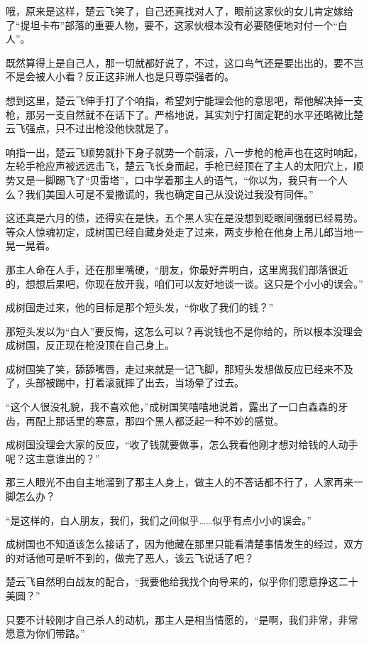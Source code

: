 哦，原来是这样，楚云飞笑了，自己还真找对人了，眼前这家伙的女儿肯定嫁给了“提坦卡布”部落的重要人物，要不，这家伙根本没有必要随便地对付一个“白人”。

既然算得上是自己人，那一切就都好说了，不过，这口鸟气还是要出出的，要不岂不是会被人小看？反正这非洲人也是只尊崇强者的。

想到这里，楚云飞伸手打了个响指，希望刘宁能理会他的意思吧，帮他解决掉一支枪，那另一支自然就不在话下了。严格地说，其实刘宁打固定靶的水平还略微比楚云飞强点，只不过出枪没他快就是了。

响指一出，楚云飞顺势就扑下身子就势一个前滚，八一步枪的枪声也在这时响起，左轮手枪应声被远远击飞，楚云飞长身而起，手枪已经顶在了主人的太阳穴上，顺势又是一脚踢飞了“贝雷塔”，口中学着那主人的语气，“你以为，我只有一个人么？我们美国人可是不爱撒谎的，我也确定自己从没说过我没有同伴。”

这还真是六月的债，还得实在是快，五个黑人实在是没想到眨眼间强弱已经易势。等众人惊魂初定，成树国已经自藏身处走了过来，两支步枪在他身上吊儿郎当地一晃一晃着。

那主人命在人手，还在那里嘴硬，“朋友，你最好弄明白，这里离我们部落很近的，想想后果吧，你现在放开我，咱们可以友好地谈一谈。这只是个小小的误会。”

成树国走过来，他的目标是那个短头发，“你收了我们的钱？”

那短头发以为“白人”要反悔，这怎么可以？再说钱也不是你给的，所以根本没理会成树国，反正现在枪没顶在自己身上。

成树国笑了笑，舔舔嘴唇，走过来就是一记飞脚，那短头发想做反应已经来不及了，头部被踢中，打着滚就摔了出去，当场晕了过去。

“这个人很没礼貌，我不喜欢他，”成树国笑嘻嘻地说着，露出了一口白森森的牙齿，再配上那话里的寒意，那四个黑人都泛起一种不妙的感觉。

成树国没理会大家的反应，“收了钱就要做事，怎么我看他刚才想对给钱的人动手呢？这主意谁出的？”

那三人眼光不由自主地溜到了那主人身上，做主人的不答话都不行了，人家再来一脚怎么办？

“是这样的，白人朋友，我们，我们之间似乎……似乎有点小小的误会。”

成树国也不知道该怎么接话了，因为他藏在那里只能看清楚事情发生的经过，双方的对话他可是听不到的，做完了恶人，该云飞说话了吧？

楚云飞自然明白战友的配合，“我要他给我找个向导来的，似乎你们愿意挣这二十美圆？”

只要不计较刚才自己杀人的动机，那主人是相当情愿的，“是啊，我们非常，非常愿意为你们带路。”

